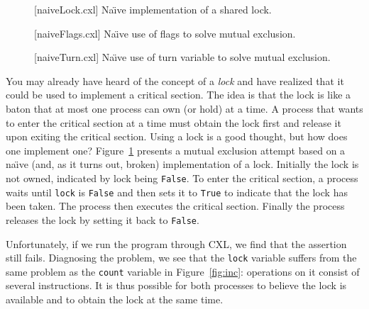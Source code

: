 \documentclass{report}
\newenvironment{code}{
\tcolorbox
}{
\endtcolorbox
}
\begin{document}
\begin{figure}
\begin{code}
\end{code}
\caption{[naiveLock.cxl] Na\"{\i}ve implementation of a shared lock.}
\label{fig:uplock}
\end{figure}

\begin{figure}
\begin{code}
\end{code}
\caption{[naiveFlags.cxl] Na\"{\i}ve use of flags to solve mutual exclusion.}
\label{fig:upflags}
\end{figure}

\begin{figure}
\begin{code}
\end{code}
\caption{[naiveTurn.cxl] Na\"{\i}ve use of turn variable to solve mutual exclusion.}
\label{fig:upturn}
\end{figure}

You may already have heard of the concept of a \emph{lock}
and have realized that
it could be used to implement a critical section.
The idea is that the lock is like a baton that at most one process can own
(or hold) at a time.
A process that wants to enter the critical section at a time must obtain the
lock first and release it upon exiting the critical section.
Using a lock is a good thought, but how does one implement one?
Figure~\ref{fig:uplock} presents a mutual exclusion attempt based on a
na\"{\i}ve (and, as it turns out, broken) implementation of a lock.
Initially the lock is not owned, indicated by lock being \texttt{False}.
To enter the critical section, a process waits until \texttt{lock} is \texttt{False}
and then sets it to \texttt{True} to indicate that the lock has been taken.
The process then executes the critical section.  Finally the process
releases the lock by setting it back to \texttt{False}.

Unfortunately, if we run the program through CXL, we find that the assertion still
fails.  Diagnosing the problem, we see that the \texttt{lock} variable
suffers from the same problem as the \texttt{count} variable
in Figure~\ref{fig:inc}: operations
on it consist of several instructions.  It is thus possible
for both processes to believe the lock is available and to obtain the lock
at the same time.
\end{document}
